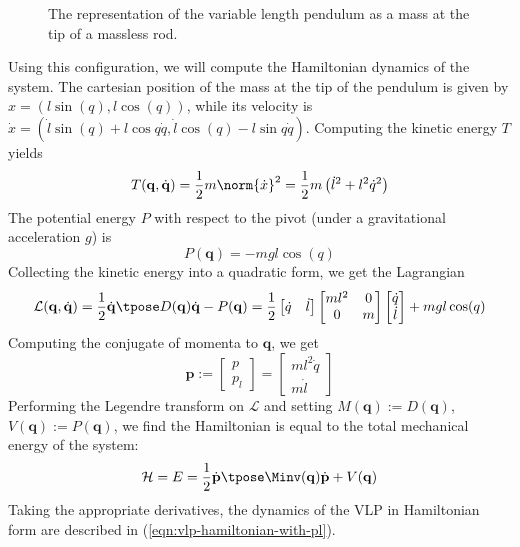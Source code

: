 \begin{figure}
   \centering
   
   \caption{The representation of the variable length pendulum as a mass at the
      tip of a massless rod.}\label{fig:vlp-model}
\end{figure}

Using this configuration, we will compute the Hamiltonian dynamics of the system.
The cartesian position of the mass at the tip of the pendulum
is given by \(x = (l\sin(q),l\cos(q))\), while its velocity is
\(\dot{x} = (\dot{l}\sin(q) + l\cos{q}\dot{q}, \dot{l}\cos(q) - l\sin{q}\dot{q})\).
Computing the kinetic energy \(T\) yields
\[
   T(\mathbf{q},\dot{\mathbf{q}}) = 
   \frac{1}{2}m\norm{\dot{x}}^2 = \frac{1}{2}m\left(\dot{l}^2 + l^2\dot{q}^2\right)
\]
The potential energy \(P\) with respect to the pivot (under a gravitational
acceleration \(g\)) is
\[
   P(\mathbf{q}) = -mgl\cos(q)
\]
Collecting the kinetic energy into a quadratic form, we get the Lagrangian
\[
   \mathcal{L}(\mathbf{q},\dot{\mathbf{q}}) 
   = \frac{1}{2} \dot{\mathbf{q}}\tpose D(\mathbf{q})\dot{\mathbf{q}} - P(\mathbf{q})
   = \frac{1}{2}
   \begin{bmatrix} \dot{q} & \dot{l} \end{bmatrix}
   \begin{bmatrix}
      ml^2 & 0 \\
      0 & m \\
   \end{bmatrix}
   \begin{bmatrix} 
      \dot{q} \\ \dot{l}
   \end{bmatrix}
   + mgl\cos(q)
\]
Computing the conjugate of momenta to \(\mathbf{q}\), we get 
\[
   \mathbf{p} := \begin{bmatrix} p \\ p_l \end{bmatrix} 
   = \begin{bmatrix} ml^2\dot{q} \\ m\dot{l} \end{bmatrix} 
\]
Performing the Legendre transform on \(\mathcal{L}\) and setting
\(M(\mathbf{q}) := D(\mathbf{q})\), \(V(\mathbf{q}) := P(\mathbf{q})\),
we find the Hamiltonian is equal to the total mechanical energy of the system:
\[
   \mathcal{H} = E = \frac{1}{2}\dot{\mathbf{p}}\tpose \Minv(\mathbf{q})
   \dot{\mathbf{p}}+V(\mathbf{q})
\]
Taking the appropriate derivatives, the dynamics of the VLP in Hamiltonian form
are described in (\ref{eqn:vlp-hamiltonian-with-pl}). 

